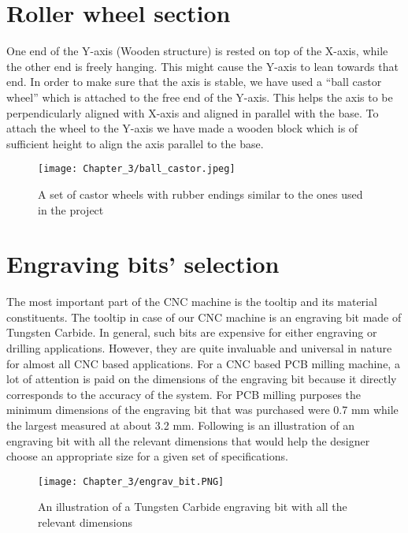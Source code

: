 \section{Roller wheel section}

One end of the Y-axis (Wooden structure) is rested on top of the X-axis, while the other end is freely hanging. This might cause the Y-axis to lean towards that end. In order to make sure that the axis is stable, we have used a “ball castor wheel” which is attached to the free end of the Y-axis. This helps the axis to be perpendicularly aligned with X-axis and aligned in parallel with the base. To attach the wheel to the Y-axis we have made a wooden block which is of sufficient height to align the axis parallel to the base.

\begin{figure}[h]
    \centering
    \texttt{[image: Chapter\_3/ball\_castor.jpeg]}
    \caption{A set of castor wheels with rubber endings similar to the ones used in the project}
    \label{fig:ballcastor}
\end{figure}

\section{Engraving bits' selection}

The most important part of the CNC machine is the tooltip and its material constituents. The tooltip in case of our CNC machine is an engraving bit made of Tungsten Carbide. In general, such bits are expensive for either engraving or drilling applications. However, they are quite invaluable and universal in nature for almost all CNC based applications. For a CNC based PCB milling machine, a lot of attention is paid on the dimensions of the engraving bit because it directly corresponds to the accuracy of the system. For PCB milling purposes the minimum dimensions of the engraving bit that was purchased were 0.7 mm while the largest measured at about 3.2 mm. Following is an illustration of an engraving bit with all the relevant dimensions that would help the designer choose an appropriate size for a given set of specifications. 

\begin{figure}[h]
    \centering
    \texttt{[image: Chapter\_3/engrav\_bit.PNG]}
    \caption{An illustration of a Tungsten Carbide engraving bit with all the relevant dimensions}
    \label{fig:ebit}
\end{figure}

